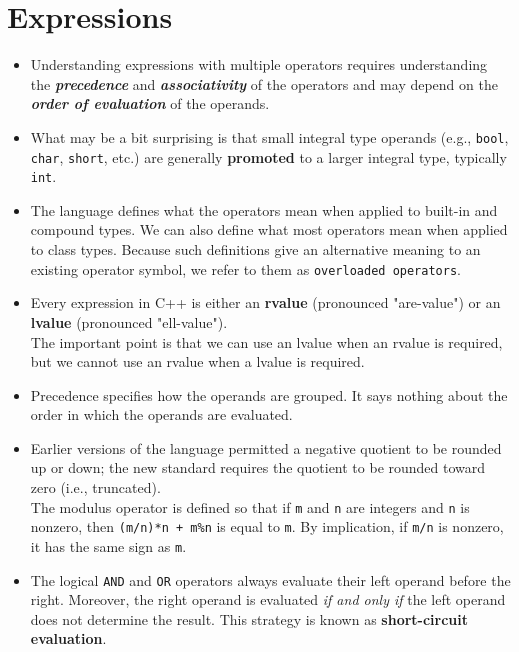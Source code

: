 \section{Expressions}
\begin{itemize}

\item
Understanding expressions with multiple operators requires understanding the \textbf{\textit{precedence}} and \textbf{\textit{associativity}} of the operators and may depend on the \textbf{\textit{order of evaluation}} of the operands.

\item
What may be a bit surprising is that small integral type operands (e.g., \texttt{bool}, \texttt{char}, \texttt{short}, etc.) are generally \textbf{promoted} to a larger integral type, typically \texttt{int}.

\item
The language defines what the operators mean when applied to built-in and compound types. We can also define what most operators mean when applied to class types. Because such definitions give an alternative meaning to an existing operator symbol, we refer to them as \texttt{overloaded operators}.

\item
Every expression in C++ is either an \textbf{rvalue} (pronounced "are-value") or an \textbf{lvalue} (pronounced "ell-value").\\
The important point is that we can use an lvalue when an rvalue is required, but we cannot use an rvalue when a lvalue is required.

\item
Precedence specifies how the operands are grouped. It says nothing about the order in which the operands are evaluated.

\item
Earlier versions of the language permitted a negative quotient to be rounded up or down; the new standard requires the quotient to be rounded toward zero (i.e., truncated).\\
The modulus operator is defined so that if \texttt{m} and \texttt{n} are integers and \texttt{n} is nonzero, then \texttt{(m/n)*n + m\%n} is equal to \texttt{m}. By implication, if \texttt{m/n} is nonzero, it has the same sign as \texttt{m}.

\item
The logical \texttt{AND} and \texttt{OR} operators always evaluate their left operand before the right. Moreover, the right operand is evaluated \textit{if and only if} the left operand does not determine the result. This strategy is known as \textbf{short-circuit evaluation}.


\end{itemize}
